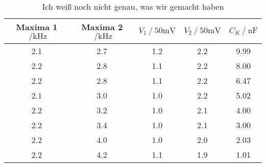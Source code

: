 \begin{table}
  \centering
  \caption{Ich weiß noch nicht genau, was wir gemacht haben} %
  \label{tab:aufgabeC}
  \begin{tabular}{c c c c c}
      \toprule
      {Maxima 1 $\;/ \si{\kilo\hertz}$} & {Maxima 2 $\;/ \si{\kilo\hertz}$} & {$V_1 \:/\: \si{50 \milli\volt}$} & {$V_2 \:/\: \si{50 \milli\volt}$} & {$C_K \:/\: \si{\nano\farad}$} \\
      \midrule
      2.1 & 2.7 & 1.2 & 2.2 & 9.99 \\
      2.2 & 2.8 & 1.1 & 2.2 & 8.00 \\
      2.2 & 2.8 & 1.1 & 2.2 & 6.47 \\
      2.1 & 3.0 & 1.0 & 2.2 & 5.02 \\
      2.2 & 3.2 & 1.0 & 2.1 & 4.00 \\
      2.2 & 3.4 & 1.0 & 2.1 & 3.00 \\
      2.2 & 4.0 & 1.0 & 2.0 & 2.03 \\
      2.2 & 4.2 & 1.1 & 1.9 & 1.01 \\
      \bottomrule
  \end{tabular}
\end{table}




